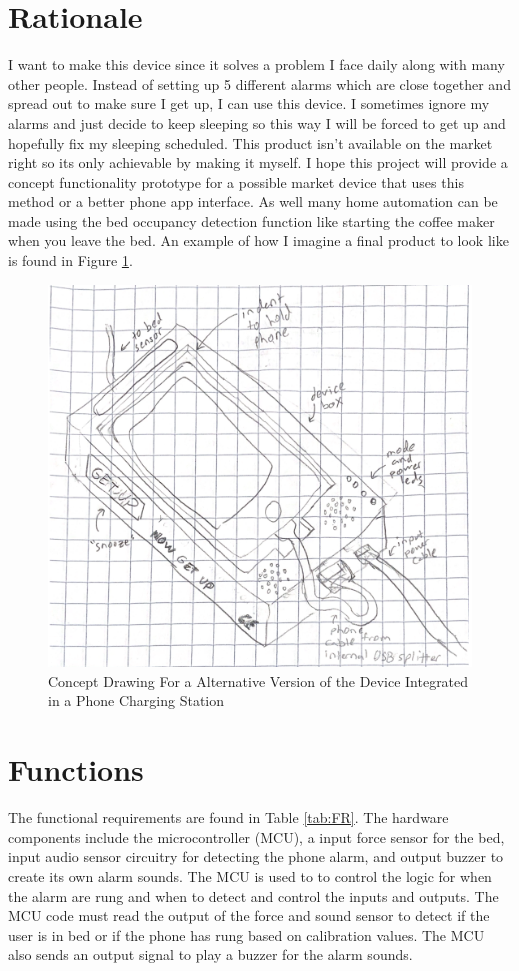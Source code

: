 \documentclass[11pt]{article}
\begin{document}
\section{Rationale}
I want to make this device since it solves a problem I face daily along with many other people.
Instead of setting up 5 different alarms which are close together and spread out to make sure I get up, I can use this device.
I sometimes ignore my alarms and just decide to keep sleeping so this way I will be forced to get up and hopefully fix my sleeping scheduled.
This product isn't available on the market right so its only achievable by making it myself.
I hope this project will provide a concept functionality prototype for a possible market device that uses this method or a better phone app interface. 
As well many home automation can be made using the bed occupancy detection function like starting the coffee maker when you leave the bed.
An example of how I imagine a final product to look like is found in Figure \ref{fig:market}.

\begin{figure}[H]
	\centering
	\includegraphics[width = 0.5\linewidth]{marketSolution}
	\caption{Concept Drawing For a Alternative Version of the Device Integrated in a Phone Charging Station}
	\label{fig:market}
\end{figure}

\section{Functions}
The functional requirements are found in Table \ref{tab:FR}.
The hardware components include the microcontroller (MCU), a input force sensor for the bed, input audio sensor circuitry for detecting the phone alarm, and output buzzer to create its own alarm sounds. 
The MCU is used to to control the logic for when the alarm are rung and when to detect and control the inputs and outputs.
The MCU code must read the output of the force and sound sensor to detect if the user is in bed or if the phone has rung based on calibration values.
The MCU also sends an output signal to play a buzzer for the alarm sounds. \\
\end{document}
